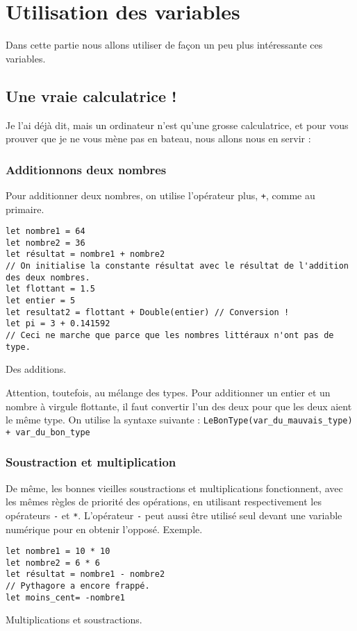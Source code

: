 \chapter{Utilisation des variables}

Dans cette partie nous allons utiliser de façon un peu plus intéressante ces variables.

\section{Une vraie calculatrice !}
Je l'ai déjà dit, mais un ordinateur n'est qu'une grosse calculatrice, et pour vous prouver que
je ne vous mène pas en bateau, nous allons nous en servir :
\subsection{Additionnons deux nombres}
Pour additionner deux nombres, on utilise l'opérateur plus, \verb"+", comme au primaire.
\begin{listing}
\begin{verbatim}
let nombre1 = 64
let nombre2 = 36
let résultat = nombre1 + nombre2
// On initialise la constante résultat avec le résultat de l'addition des deux nombres.
let flottant = 1.5
let entier = 5
let resultat2 = flottant + Double(entier) // Conversion !
let pi = 3 + 0.141592 
// Ceci ne marche que parce que les nombres littéraux n'ont pas de type.
\end{verbatim}
\caption{Des additions.}
\end{listing}

Attention, toutefois, au mélange des types. Pour additionner un entier et un nombre à virgule flottante, il faut convertir l'un des deux pour que les deux aient le même type.
On utilise la syntaxe suivante : \texttt{LeBonType(var_du_mauvais_type) + var_du_bon_type}

\subsection{Soustraction et multiplication}
De même, les bonnes vieilles soustractions et multiplications fonctionnent, avec les mêmes règles de priorité des opérations, en utilisant respectivement les opérateurs \verb"-" et \verb"*".
L'opérateur \verb"-" peut aussi être utilisé seul devant une variable numérique pour en obtenir l'opposé.
Exemple.
\begin{listing}
\begin{verbatim}
let nombre1 = 10 * 10
let nombre2 = 6 * 6
let résultat = nombre1 - nombre2
// Pythagore a encore frappé. 
let moins_cent= -nombre1
\end{verbatim}
\caption{Multiplications et soustractions.}
\end{listing}

